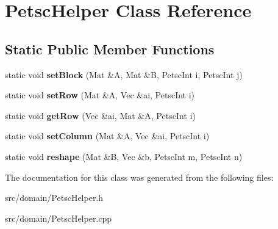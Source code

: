 \hypertarget{class_petsc_helper}{}\section{Petsc\+Helper Class Reference}
\label{class_petsc_helper}
\subsection*{Static Public Member Functions}
\begin{DoxyCompactItemize}
\item 
\hypertarget{class_petsc_helper_a322ae6e79127333879141c4a30d339dc}{}static void {\bfseries set\+Block} (Mat \&A, Mat \&B, Petsc\+Int i, Petsc\+Int j)\label{class_petsc_helper_a322ae6e79127333879141c4a30d339dc}

\item 
\hypertarget{class_petsc_helper_af7852884a00a9819e928e16553898b47}{}static void {\bfseries set\+Row} (Mat \&A, Vec \&ai, Petsc\+Int i)\label{class_petsc_helper_af7852884a00a9819e928e16553898b47}

\item 
\hypertarget{class_petsc_helper_a8d80ba637aaeac16f8bfd2af40f3983d}{}static void {\bfseries get\+Row} (Vec \&ai, Mat \&A, Petsc\+Int i)\label{class_petsc_helper_a8d80ba637aaeac16f8bfd2af40f3983d}

\item 
\hypertarget{class_petsc_helper_a6be1aa6939210adc087cff94ef217267}{}static void {\bfseries set\+Column} (Mat \&A, Vec \&ai, Petsc\+Int i)\label{class_petsc_helper_a6be1aa6939210adc087cff94ef217267}

\item 
\hypertarget{class_petsc_helper_a30c7c416ad5fdd5d4d9edb1ea4a3936f}{}static void {\bfseries reshape} (Mat \&B, Vec \&b, Petsc\+Int m, Petsc\+Int n)\label{class_petsc_helper_a30c7c416ad5fdd5d4d9edb1ea4a3936f}

\end{DoxyCompactItemize}


The documentation for this class was generated from the following files\+:\begin{DoxyCompactItemize}
\item 
src/domain/Petsc\+Helper.\+h\item 
src/domain/Petsc\+Helper.\+cpp\end{DoxyCompactItemize}
